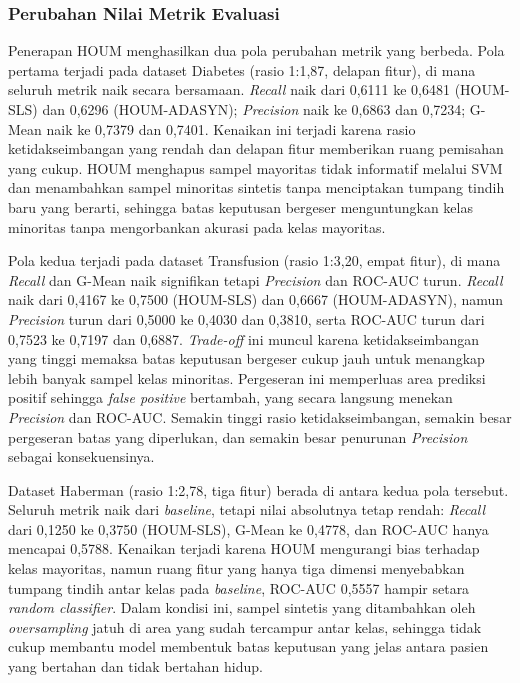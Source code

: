 \subsubsection{Perubahan Nilai Metrik Evaluasi}
Penerapan HOUM menghasilkan dua pola perubahan metrik yang berbeda. Pola pertama terjadi pada dataset Diabetes (rasio 1:1,87, delapan fitur), di mana seluruh metrik naik secara bersamaan. \textit{Recall} naik dari 0,6111 ke 0,6481 (HOUM-SLS) dan 0,6296 (HOUM-ADASYN); \textit{Precision} naik ke 0,6863 dan 0,7234; G-Mean naik ke 0,7379 dan 0,7401. Kenaikan ini terjadi karena rasio ketidakseimbangan yang rendah dan delapan fitur memberikan ruang pemisahan yang cukup. HOUM menghapus sampel mayoritas tidak informatif melalui SVM dan menambahkan sampel minoritas sintetis tanpa menciptakan tumpang tindih baru yang berarti, sehingga batas keputusan bergeser menguntungkan kelas minoritas tanpa mengorbankan akurasi pada kelas mayoritas.

Pola kedua terjadi pada dataset Transfusion (rasio 1:3,20, empat fitur), di mana \textit{Recall} dan G-Mean naik signifikan tetapi \textit{Precision} dan ROC-AUC turun. \textit{Recall} naik dari 0,4167 ke 0,7500 (HOUM-SLS) dan 0,6667 (HOUM-ADASYN), namun \textit{Precision} turun dari 0,5000 ke 0,4030 dan 0,3810, serta ROC-AUC turun dari 0,7523 ke 0,7197 dan 0,6887. \textit{Trade-off} ini muncul karena ketidakseimbangan yang tinggi memaksa batas keputusan bergeser cukup jauh untuk menangkap lebih banyak sampel kelas minoritas. Pergeseran ini memperluas area prediksi positif sehingga \textit{false positive} bertambah, yang secara langsung menekan \textit{Precision} dan ROC-AUC. Semakin tinggi rasio ketidakseimbangan, semakin besar pergeseran batas yang diperlukan, dan semakin besar penurunan \textit{Precision} sebagai konsekuensinya.

Dataset Haberman (rasio 1:2,78, tiga fitur) berada di antara kedua pola tersebut. Seluruh metrik naik dari \textit{baseline}, tetapi nilai absolutnya tetap rendah: \textit{Recall} dari 0,1250 ke 0,3750 (HOUM-SLS), G-Mean ke 0,4778, dan ROC-AUC hanya mencapai 0,5788. Kenaikan terjadi karena HOUM mengurangi bias terhadap kelas mayoritas, namun ruang fitur yang hanya tiga dimensi menyebabkan tumpang tindih antar kelas pada \textit{baseline}, ROC-AUC 0,5557 hampir setara \textit{random classifier}. Dalam kondisi ini, sampel sintetis yang ditambahkan oleh \textit{oversampling} jatuh di area yang sudah tercampur antar kelas, sehingga tidak cukup membantu model membentuk batas keputusan yang jelas antara pasien yang bertahan dan tidak bertahan hidup. \par

